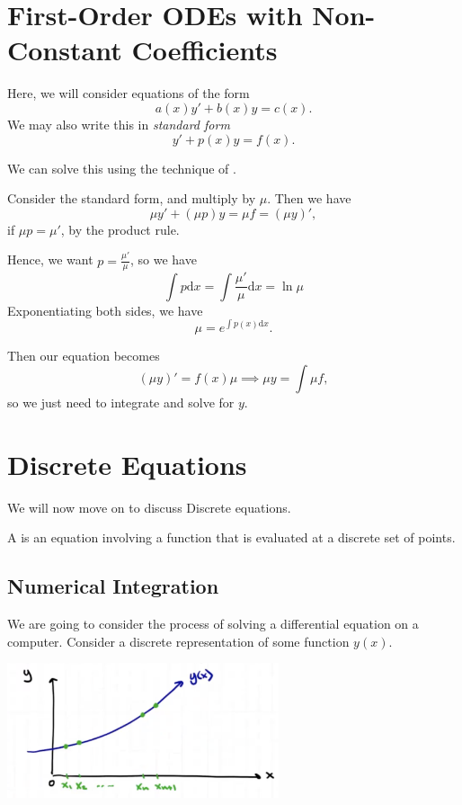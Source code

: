\documentclass[a4paper]{scrreprt}
\newcommand{\dd}{\mathrm{d}}
\begin{document}
\section{First-Order ODEs with Non-Constant Coefficients}

Here, we will consider equations of the form
$$
a(x)y' + b(x)y = c(x).
$$
We may also write this in \emph{standard form}
$$
y' + p(x)y = f(x).
$$

We can solve this using the technique of .

Consider the standard form, and multiply by $\mu$.
Then we have
$$
\mu y' + (\mu p) y = \mu f = (\mu y)',
$$
if $\mu p = \mu'$, by the product rule.


Hence, we want $p = \frac{\mu'}{\mu}$, so we have
$$
\int p \dd x = \int \frac{\mu '}{\mu} \dd x = \ln \mu
$$
Exponentiating both sides, we have
$$
\mu = e^{\int p(x) \dd x}.
$$

Then our equation becomes
$$
(\mu y)' = f(x) \mu \implies \mu y = \int \mu f,
$$
so we just need to integrate and solve for $y$.

\section{Discrete Equations}

We will now move on to discuss Discrete equations.

\begin{definition}
A  is an equation involving a function that is evaluated at a discrete set of points.	
\end{definition}

\subsection{Numerical Integration}

We are going to consider the process of solving a differential equation on a computer.
Consider a discrete representation of some function $y(x)$.

\begin{center}
	\includegraphics[width=0.6\textwidth]{discrete.png}
\end{center}
\end{document}
